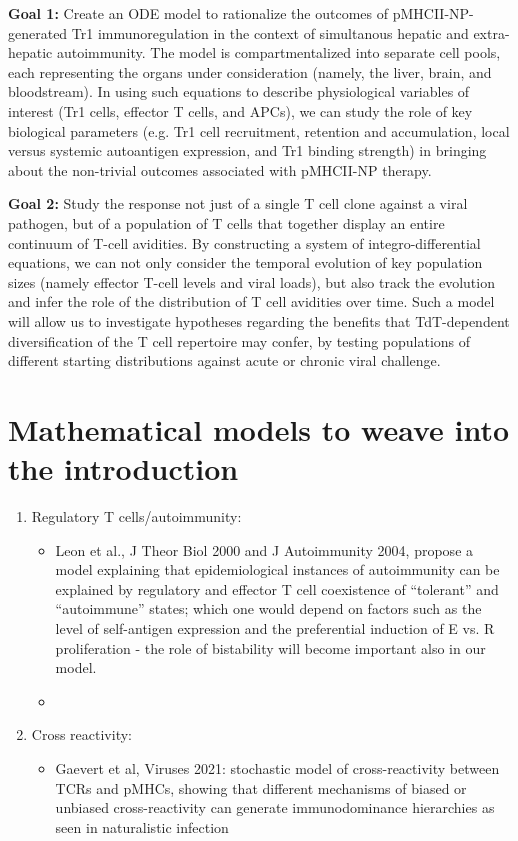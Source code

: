 \textbf{Goal 1:} Create an ODE model to rationalize the outcomes of pMHCII-NP-generated Tr1 immunoregulation in the context of simultanous hepatic and extra-hepatic autoimmunity. The model is compartmentalized into separate cell pools, each representing the organs under consideration (namely, the liver, brain, and bloodstream). In using such equations to describe physiological variables of interest (Tr1 cells, effector T cells, and APCs), we can study the role of key biological parameters (e.g. Tr1 cell recruitment, retention and accumulation, local versus systemic autoantigen expression, and Tr1 binding strength) in bringing about the non-trivial outcomes associated with pMHCII-NP therapy. 

\textbf{Goal 2:} Study the response not just of a single T cell clone against a viral pathogen, but of a population of T cells that together display an entire continuum of T-cell avidities. By constructing a system of integro-differential equations, we can not only consider the temporal evolution of key population sizes (namely effector T-cell levels and viral loads), but also track the evolution and infer the role of the distribution of T cell avidities over time. Such a model will allow us to investigate hypotheses regarding the benefits that TdT-dependent diversification of the T cell repertoire may confer, by testing populations of different starting distributions against acute or chronic viral challenge.

\section*{Mathematical models to weave into the introduction}

\begin{enumerate}

 \item Regulatory T cells/autoimmunity:
\begin{itemize}
    \item Leon et al., J Theor Biol 2000 and J Autoimmunity 2004, propose a model explaining that epidemiological instances of autoimmunity can be explained by regulatory and effector T cell coexistence of ``tolerant'' and ``autoimmune'' states; which one would depend on factors such as the level of self-antigen expression and the preferential induction of E vs. R proliferation  - the role of bistability will become important also in our model.
    \item 
\end{itemize}

\item Cross reactivity:
\begin{itemize}
    \item Gaevert et al, Viruses 2021: stochastic model of cross-reactivity between TCRs and pMHCs, showing that different mechanisms of biased or unbiased cross-reactivity can generate immunodominance hierarchies as seen in naturalistic infection
\end{itemize}

\end{enumerate}

